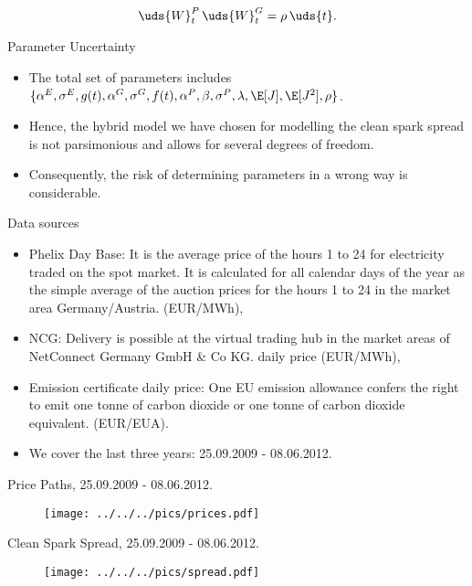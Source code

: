 \begin{equation}
\uds{W}^P_t\,\uds{W}^G_t = \rho\,\uds{t}.
\label{corr}
\end{equation}

{Parameter Uncertainty}
\begin{itemize}
\item The total set of parameters includes $\{\alpha^E, \sigma^E, g(t), \alpha^G, \sigma^G, f(t), \alpha^P, \beta, \sigma^P, \lambda, \E[J], \E[J^2], \rho\}$.
\item Hence, the hybrid model we have chosen for modelling the clean spark spread is not parsimonious and allows for several degrees of freedom.
\item Consequently, the risk of determining parameters in a wrong way is considerable.
\end{itemize}


{Data sources}
\begin{itemize}
\item Phelix Day Base: It is the average price of the hours 1 to 24 for electricity traded on the spot market.
It is calculated for all calendar days of the year as the simple average of the auction prices for the
hours 1 to 24 in the market area Germany/Austria. (EUR/MWh),
\item NCG: Delivery is possible at the virtual trading hub in the market areas of
NetConnect Germany GmbH \& Co KG. daily price (EUR/MWh),
\item Emission certificate daily price: One EU emission allowance confers the right to emit one tonne of carbon dioxide or one tonne of
carbon dioxide equivalent. (EUR/EUA).
\item We cover the last three years: 25.09.2009 - 08.06.2012.
\end{itemize}

{Price Paths, 25.09.2009 - 08.06.2012.}
\begin{figure}[htp]
\centering
\texttt{[image: ../../../pics/prices.pdf]}
\label{prices}
\end{figure}

{Clean Spark Spread, 25.09.2009 - 08.06.2012.}
\begin{figure}[htp]
\centering
\texttt{[image: ../../../pics/spread.pdf]}
\label{spread}
\end{figure}

